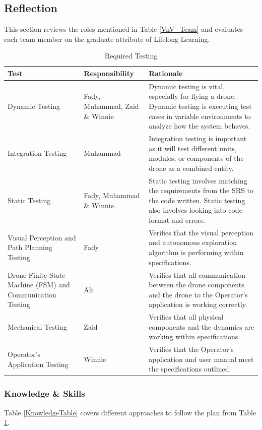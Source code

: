 \documentclass[12pt, titlepage]{article}
\begin{document}
\newpage{}
\subsection{Reflection}
This section reviews the roles mentioned in Table \ref{VnV_Team} and evaluates each team member on the graduate attribute of Lifelong Learning. 

  
\begin{table}[!h]
\begin{center}
\caption {Required Testing}
\label{RequiredTesting}
\begin{tabular}{ | m{3cm} | m{3cm} | m{8cm} | }
\hline
Test & Responsibility & Rationale\\
\hline
Dynamic Testing & Fady, Muhammad, Zaid \& Winnie & Dynamic testing is vital, especially for flying a drone. Dynamic testing is executing test cases in variable environments to analyze how the system behaves.\\
\hline
Integration Testing & Muhammad & Integration testing is important as it will test different units, modules, or components of the drone as a combined entity.\\
\hline
Static Testing & Fady, Muhammad \& Winnie & Static testing involves matching the requirements from the SRS to the code written. Static testing also involves looking into code format and errors. \\
\hline
 Visual Perception and Path Planning Testing & Fady & Verifies that the visual perception and autonomous exploration algorithm is performing within specifications. \\
\hline
Drone Finite State Machine (FSM) and Communication Testing & Ali & Verifies that all communication between the drone components and the drone to the Operator's application is working correctly. \\
\hline
Mechanical Testing & Zaid & Verifies that all physical components and the dynamics are working within specifications. \\
\hline
Operator's Application Testing & Winnie & Verifies that the Operator's application and user manual meet the specifications outlined.
\\
\hline
\end{tabular}
\end{center}
\end{table}

\subsubsection{Knowledge \& Skills}
Table \ref{KnowledgeTable} covers different approaches to follow the plan from Table \ref{RequiredTesting}.
\end{document}

